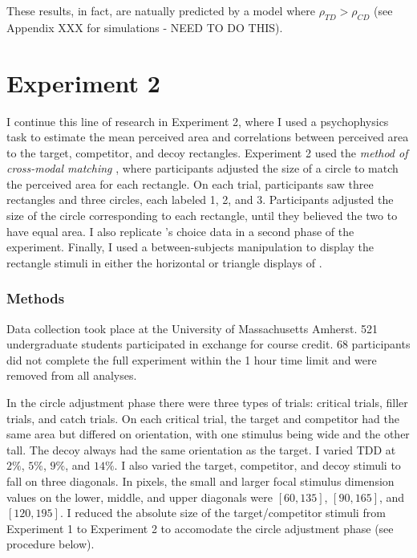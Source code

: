 {{These results, in fact, are natually predicted by a model where $\rho_{TD}>\rho_{CD}$ (see Appendix XXX for simulations - NEED TO DO THIS).

\section{Experiment 2}
I continue this line of research in Experiment 2, where I used a psychophysics task to estimate the mean perceived area and correlations between perceived area to the target, competitor, and decoy rectangles. Experiment 2 used the \textit{method of cross-modal matching} \parencite{stevensCrossmodalityMatchingBrightness1965}, where participants adjusted the size of a circle to match the perceived area for each rectangle. On each trial, participants saw three rectangles and three circles, each labeled 1, 2, and 3. Participants adjusted the size of the circle corresponding to each rectangle, until they believed the two to have equal area. I also replicate \textcite{spektorWhenGoodLooks2018b}'s choice data in a second phase of the experiment. Finally, I used a between-subjects manipulation to display the rectangle stimuli in either the horizontal or triangle displays of \textcite{spektorWhenGoodLooks2018b}.

\subsubsection{Methods}
Data collection took place at the University of Massachusetts Amherst. 521 undergraduate students participated in exchange for course credit. 68 participants did not complete the full experiment within the 1 hour time limit and were removed from all analyses. 

In the circle adjustment phase there were three types of trials: critical trials, filler trials, and catch trials. On each critical trial, the target and competitor had the same area but differed on orientation, with one stimulus being wide and the other tall. The decoy always had the same orientation as the target. I varied TDD at $2\%$, $5\%$, $9\%$, and $14\%$. I also varied the target, competitor, and decoy stimuli to fall on three diagonals. In pixels, the small and larger focal stimulus dimension values on the lower, middle, and upper diagonals were $[60, 135]$, $[90, 165]$, and $[120,195]$. I reduced the absolute size of the target/competitor stimuli from Experiment 1 to Experiment 2 to accomodate the circle adjustment phase (see procedure  below).

}}
